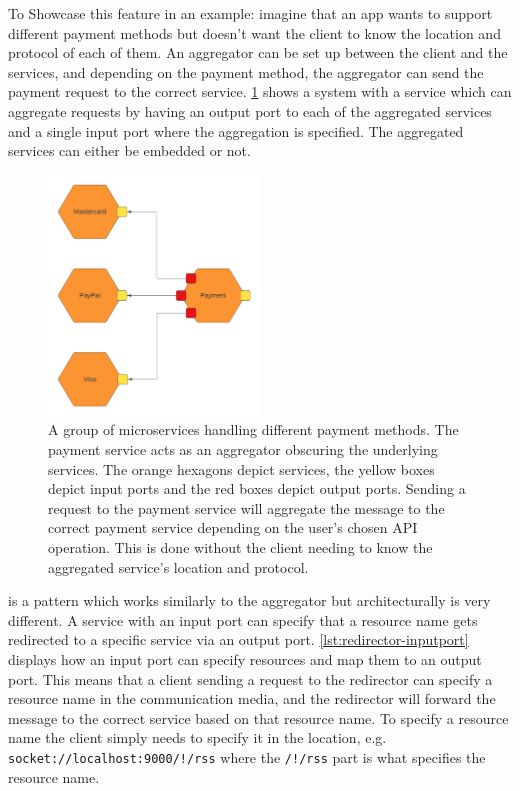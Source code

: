 To Showcase this feature in an example: imagine that an app wants to support different payment methods but doesn't want the client to know the location and protocol of each of them. An aggregator can be set up between the 
client and the services, and depending on the payment method, the aggregator can send the payment request to the correct service.
\cref{figure:aggregator_example} shows a system with a service which can aggregate requests by having an output port to each of the aggregated services and a single input port where the aggregation is specified. The aggregated services can either be embedded or not.
\begin{figure}[h!]
    \center
    \includegraphics[width=0.5\textwidth]{figures/aggregator_example.png}
    \caption{A group of microservices handling different payment methods. The payment service acts as an aggregator obscuring the underlying services. The orange hexagons depict services, the yellow boxes depict input ports and the red boxes depict output ports.
    Sending a request to the payment service will aggregate the message to the correct payment service depending on the user's chosen API operation. This is done without the client needing to know the aggregated service's location and protocol.}
    \label{figure:aggregator_example}
\end{figure}
 is a pattern which works similarly to the aggregator but architecturally is very different.
A service with an input port can specify that a resource name gets redirected to a specific service via an output port.
\cref{lst:redirector-inputport} displays how an input port can specify resources and map them to an output port.
This means that a client sending a request to the redirector can specify a resource name in the communication media, and the redirector will forward the message to the correct service based on that resource name.
To specify a resource name the client simply needs to specify it in the location, e.g. \texttt{socket://localhost:9000/!/rss} where the \texttt{/!/rss} part is what specifies the resource name.

